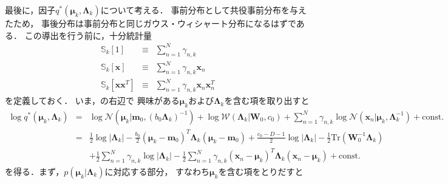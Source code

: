 最後に，因子$q^*(\bm\mu_{k},\bm\Lambda_{k})$について考える．
事前分布として共役事前分布を与えたため，
事後分布は事前分布と同じガウス・ウィシャート分布になるはずである．
この導出を行う前に，十分統計量
\begin{eqnarray}
\mathbb{S}_{k}[1] 
&\equiv& \sum_{n=1}^{N} \gamma_{n,k}
\label{eq:s}\\
\mathbb{S}_{k}[\bm{x}] 
&\equiv& 
\sum_{n=1}^{N} \gamma_{n,k} 
\bm{x}_{n}
\label{eq:sy}\\
\mathbb{S}_{k}[\bm{x}\bm{x}^T] 
&\equiv& 
\sum_{n=1}^{N} \gamma_{n,k} 
\bm{x}_{n}\bm{x}_{n}^T
\label{eq:syy}
\end{eqnarray}
を定義しておく．
いま，の右辺で
興味がある$\bm\mu_{k}$および$\bm\Lambda_{k}$を含む項を取り出すと
\begin{eqnarray}
\log q^*(\bm\mu_{k},\bm\Lambda_{k})
&=& 
\log \mathcal{N}\left(\bm\mu_{k}\big|\bm{m}_0,\left(b_0\bm\Lambda_{k}\right)^{-1}\right)
+
\log \mathcal{W}\left(\bm\Lambda_{k}\big|\bm{W}_0,c_0\right)
+
\sum_{n=1}^{N}
\gamma_{n,k}
\log \mathcal{N}\left(\bm{x}_n\big|\bm\mu_{k},\bm\Lambda_{k}^{-1}\right)
+ \mbox{const.}
\nonumber\\
&=&
\frac{1}{2}\log|\bm\Lambda_{k}|
- \frac{b_0}{2} (\bm\mu_{k} - \bm{m}_0)^T\bm\Lambda_{k}(\bm\mu_{k} - \bm{m}_0)
+
\frac{c_0 - D - 1}{2} \log|\bm\Lambda_{k}|
-\frac{1}{2}\mbox{Tr}\left(\bm{W}_0^{-1}\bm\Lambda_{k}\right)
\nonumber\\
&&
+\frac{1}{2}
\sum_{n=1}^{N} 
\gamma_{n,k} \log|\bm\Lambda_{k}|
-\frac{1}{2}
\sum_{n=1}^{N} 
\gamma_{n,k}  
(\bm{x}_n - \bm\mu_{k})^T\bm
\Lambda_{k}(\bm{x}_n - \bm\mu_{k})
+ \mbox{const.}
\label{eq:qphik}
\end{eqnarray}
を得る．まず，$p(\bm\mu_{k}|\bm\Lambda_{k})$に対応する部分，
すなわち$\bm\mu_{k}$を含む項をとりだすと
